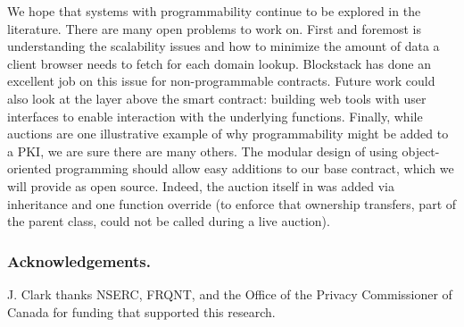 We hope that \UA systems with programmability continue to be explored in the literature. There are many open problems to work on. First and foremost is understanding the scalability issues and how to minimize the amount of data a client browser needs to fetch for each domain lookup. Blockstack has done an excellent job on this issue for non-programmable contracts. Future work could also look at the layer above the smart contract: building web tools with user interfaces to enable interaction with the underlying functions. Finally, while auctions are one illustrative example of why programmability might be added to a PKI, we are sure there are many others. The modular design of \Ghazal using object-oriented programming should allow easy additions to our base contract, which we will provide as open source. Indeed, the auction itself in \Ghazalstar was added via inheritance and one function override (to enforce that ownership transfers, part of the parent class, could not be called during a live auction).  
 
\subsubsection*{Acknowledgements.} J. Clark thanks NSERC, FRQNT, and the Office of the Privacy Commissioner of Canada for funding that supported this research. 

































